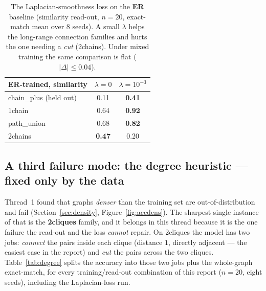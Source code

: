 \documentclass[11pt,a4paper]{article}
\begin{document}
\begin{table}[H]
\centering
\begin{tabular}{lcc}
\toprule
ER-trained, similarity & $\lambda=0$ & $\lambda=10^{-3}$ \\
\midrule
chain\_plus (held out) & 0.11 & \textbf{0.41} \\
1chain                 & 0.64 & \textbf{0.92} \\
path\_union            & 0.68 & \textbf{0.82} \\
2chains                & \textbf{0.47} & 0.20 \\
\bottomrule
\end{tabular}
\caption{The Laplacian-smoothness loss on the \textbf{ER} baseline (similarity read-out, $n=20$,
exact-match mean over $8$ seeds). A small $\lambda$ helps the long-range connection families and
hurts the one needing a \emph{cut} (2chains). Under mixed training the same comparison is flat
($|\Delta|\le0.04$).}
\label{tab:lambda}
\end{table}

\subsection{A third failure mode: the degree heuristic --- fixed only by the data}
\label{sec:third}

Thread~1 found that graphs \emph{denser} than the training set are out-of-distribution and fail
(Section~\ref{sec:density}, Figure~\ref{fig:accdens}). The sharpest single instance of that is the
\textbf{2cliques} family, and it belongs in this thread because it is the one failure the
read-out and the loss \emph{cannot} repair. On 2cliques the model has two jobs: \emph{connect} the
pairs inside each clique (distance $1$, directly adjacent --- the easiest case in the report) and
\emph{cut} the pairs across the two cliques. Table~\ref{tab:degree} splits the accuracy into those
two jobs plus the whole-graph exact-match, for every training/read-out combination of this report
($n=20$, eight seeds), including the Laplacian-loss run.
\end{document}
